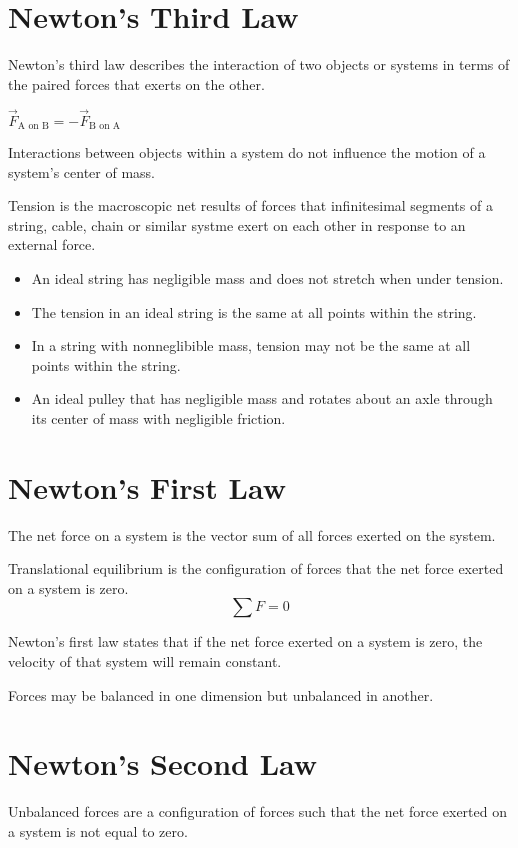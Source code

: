 \documentclass[../mech.tex]{subfiles}
\begin{document}
\section{Newton's Third Law}
Newton's third law describes the interaction of two objects or systems in terms of the paired forces that exerts on the other.
\begin{center}
    $\vec{F}_{\text{A on B}} = -\vec{F}_{\text{B on A}}$
\end{center}
Interactions between objects within a system do not influence the motion of a system's center of mass.

Tension is the macroscopic net results of forces that infinitesimal segments of a string, cable, chain or similar systme exert on each other in response to an external force.
\begin{itemize}
    \item An ideal string has negligible mass and does not stretch when under tension.
    \item The tension in an ideal string is the same at all points within the string.
    \item In a string with nonneglibible mass, tension may not be the same at all points within the string.
    \item An ideal pulley that has negligible mass and rotates about an axle through its center of mass with negligible friction.
\end{itemize}

\section{Newton's First Law}
The net force on a system is the vector sum of all forces exerted on the system.

Translational equilibrium is the configuration of forces that the net force exerted on a system is zero.
\[ \sum F = 0 \]

Newton's first law states that if the net force exerted on a system is zero, the velocity of that system will remain constant.

Forces may be balanced in one dimension but unbalanced in another.

\section{Newton's Second Law}
Unbalanced forces are a configuration of forces such that the net force exerted on a system is not equal to zero.
\end{document}
